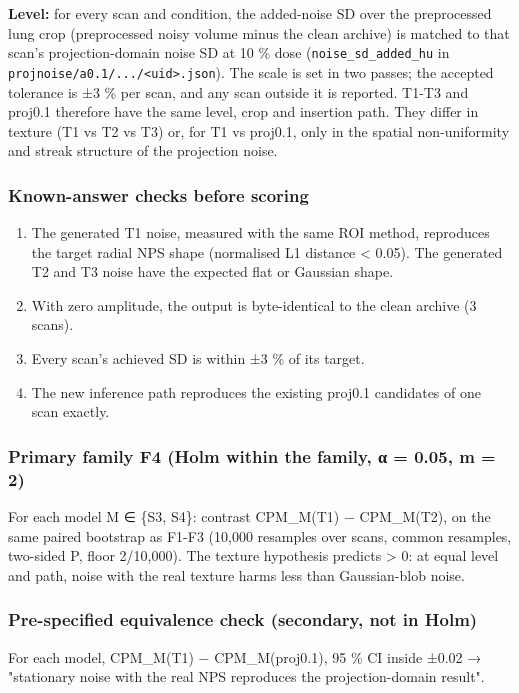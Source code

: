 \textbf{Level:} for every scan and condition, the added-noise SD over the preprocessed lung crop (preprocessed noisy volume minus the clean archive) is matched to that scan's projection-domain noise SD at 10 \% dose (\texttt{noise\_sd\_added\_hu} in \texttt{projnoise/a0.1/.../\textless{}uid\textgreater{}.json}). The scale is set in two passes; the accepted tolerance is ±3 \% per scan, and any scan outside it is reported. T1-T3 and proj0.1 therefore have the same level, crop and insertion path. They differ in texture (T1 vs T2 vs T3) or, for T1 vs proj0.1, only in the spatial non-uniformity and streak structure of the projection noise.

\subsubsection*{Known-answer checks before scoring}
\begin{enumerate}
\item The generated T1 noise, measured with the same ROI method, reproduces the target radial NPS shape (normalised L1 distance \textless{} 0.05). The generated T2 and T3 noise have the expected flat or Gaussian shape.
\item With zero amplitude, the output is byte-identical to the clean archive (3 scans).
\item Every scan's achieved SD is within ±3 \% of its target.
\item The new inference path reproduces the existing proj0.1 candidates of one scan exactly.
\end{enumerate}

\subsubsection*{Primary family F4 (Holm within the family, α = 0.05, m = 2)}
For each model M ∈ \{S3, S4\}: contrast CPM\_M(T1) − CPM\_M(T2), on the same paired bootstrap as F1-F3 (10,000 resamples over scans, common resamples, two-sided P, floor 2/10,000). The texture hypothesis predicts \textgreater{} 0: at equal level and path, noise with the real texture harms less than Gaussian-blob noise.

\subsubsection*{Pre-specified equivalence check (secondary, not in Holm)}
For each model, CPM\_M(T1) − CPM\_M(proj0.1), 95 \% CI inside ±0.02 → "stationary noise with the real NPS reproduces the projection-domain result".

